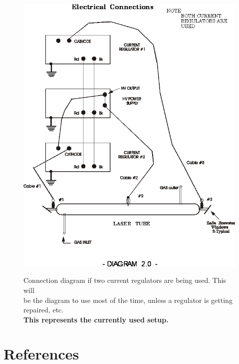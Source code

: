\documentclass{../lab}
\begin{document}
\begin{figure}[H]
\captionsetup{justification=centering}
\centering
    \href{http://experimentationlab.berkeley.edu/sites/default/files/images/CO210.gif}{\includegraphics[width=0.4\linewidth]{images/CO210.png}} \\
    \caption{Connection diagram if two current regulators are being used. This will \\ be the diagram to use most of the time, unless a regulator is getting repaired, etc. \\\textbf{This represents the currently used setup.}}
\end{figure}

\section{References}
\label{sec:References}
\end{document}
